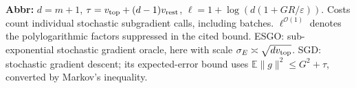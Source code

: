 \begin{table}[tp]
\begin{threeparttable}
\begin{tabularx}{\linewidth}{@{}>{\raggedright\arraybackslash}p{0.20\linewidth}>{\raggedright\arraybackslash}p{0.32\linewidth}>{\raggedright\arraybackslash}p{0.25\linewidth}>{\raggedright\arraybackslash}X@{}}
\bottomrule
\end{tabularx}
\begin{tablenotes}[flushleft]\footnotesize
\item[] \textbf{Abbr:} $d=m+1$, $\tau=v_{\rm top}+(d-1)v_{\rm rest}$, $\ell=1+\log(d(1+GR/\varepsilon))$. Costs count individual stochastic subgradient calls, including batches. $\ell^{\mathcal{O}(1)}$ denotes the polylogarithmic factors suppressed in the cited bound. ESGO: sub-exponential stochastic gradient oracle, here with scale $\sigma_E\asymp\sqrt{dv_{\rm top}}$. SGD: stochastic gradient descent; its expected-error bound uses $\mathbb E\|g\|^2\le G^2+\tau$, converted by Markov's inequality.
\end{tablenotes}
\end{threeparttable}
\end{table}
\clearpage
